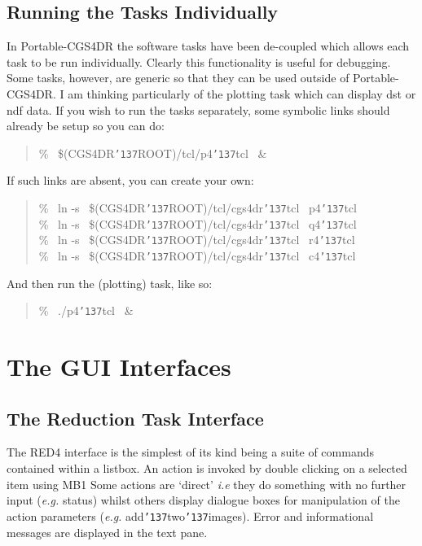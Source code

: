 \documentclass[a4paper]{book}
\newcommand{\stardocinitials}  {SUN}
\newcommand{\stardocnumber}    {27.5}
\newcommand{\stardocname}{\stardocinitials /\stardocnumber}
\renewcommand{\_}{{\tt\char'137}}
\begin{document}
\section{Running the Tasks Individually}
In Portable-CGS4DR the software tasks have been de-coupled which allows each task to be
run individually. Clearly this functionality is useful for debugging. Some tasks, however,
are generic so that they can be used outside of Portable-CGS4DR. I am thinking particularly
of the plotting task which can display {\sc dst} or {\sc ndf} data. If you wish to run the
tasks separately, some symbolic links should already be setup so you can do:

\begin{quote}
  \% \ \$(CGS4DR\_ROOT)/tcl/p4\_tcl \ \& \ \\
\end{quote}

If such links are absent, you can create your own:

\begin{quote}
  \% \ ln -s \ \$(CGS4DR\_ROOT)/tcl/cgs4dr\_tcl \ p4\_tcl \\
  \% \ ln -s \ \$(CGS4DR\_ROOT)/tcl/cgs4dr\_tcl \ q4\_tcl \\
  \% \ ln -s \ \$(CGS4DR\_ROOT)/tcl/cgs4dr\_tcl \ r4\_tcl \\
  \% \ ln -s \ \$(CGS4DR\_ROOT)/tcl/cgs4dr\_tcl \ c4\_tcl 
\end{quote}

And then run the (plotting) task, like so:

\begin{quote}
  \% \ ./p4\_tcl \ \&
\end{quote}

\markboth{The GUI Interfaces}{\stardocname}
\chapter{The GUI Interfaces}
\section{The Reduction Task Interface}
The RED4 interface is the simplest of its kind being a suite of commands 
contained within a listbox. An action is invoked by double clicking on a selected item using MB1
Some actions are `direct' {\em i.e} they do something with no further
input ({\em e.g.} status) whilst others display dialogue boxes for manipulation of the action
parameters ({\em e.g.} add\_two\_images). Error and informational messages are displayed in the text pane.
\end{document}
